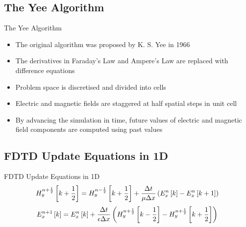 \documentclass{beamer}
\begin{document}
\subsection{The Yee Algorithm}
\begin{frame}{The Yee Algorithm}
	\begin{itemize}
	\item The original algorithm was proposed by K. S. Yee in 1966~\cite{Yee1966}
	\item The derivatives in Faraday's Law and Ampere's Law are replaced with difference equations
	\item Problem space is discretised and divided into cells
	\item Electric and magnetic fields are staggered at half spatial steps in unit cell
	\item By advancing the simulation in time, future values of electric and magnetic field components are computed using past values
	\end{itemize}
\end{frame}
\subsection{FDTD Update Equations in 1D}
\begin{frame}{FDTD Update Equations in 1D}
	\begin{equation*}
	\centering
	H^{n+\frac{1}{2}}_y \left[k+\frac{1}{2}\right]=H^{n-\frac{1}{2}}_y \left[k+\frac{1}{2}\right] + \dfrac{\Delta t}{\mu \Delta x} \left( E^{n}_x \left[k\right] - E^{n}_x \left[k+1\right] \right)
	\label{Hy-1D-Simple-FDTD-Driver}
	\end{equation*}
	\begin{equation*}
	\centering
	E^{n+1}_x \left[k\right]=E^{n}_x \left[k\right] + \dfrac{\Delta t}{\epsilon \Delta x} \left( H^{n+\frac{1}{2}}_y \left[k-\frac{1}{2}\right] - H^{n+\frac{1}{2}}_y \left[k+\frac{1}{2}\right] \right)
	\label{Ex-1D-Simple-FDTD-Driver}
	\end{equation*}
\end{frame}
\end{document}
